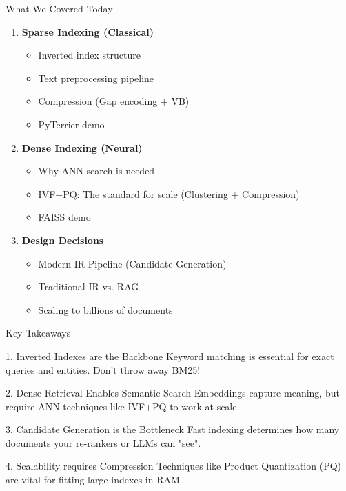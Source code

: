 \documentclass[aspectratio=169]{beamer}
\newif\ifanimated
\newcommand{\cpause}{\ifanimated\pause\fi}
\begin{document}
\begin{frame}[shrink=5]{What We Covered Today}
\begin{enumerate}
    \item \textbf{Sparse Indexing (Classical)}
    \begin{itemize}
        \item Inverted index structure
        \item Text preprocessing pipeline
        \item Compression (Gap encoding + VB)
        \item PyTerrier demo
    \end{itemize}
    
    \item \textbf{Dense Indexing (Neural)}
    \begin{itemize}
        \item Why ANN search is needed
        \item IVF+PQ: The standard for scale (Clustering + Compression)
        \item FAISS demo
    \end{itemize}
    
    \item \textbf{Design Decisions}
    \begin{itemize}
        \item Modern IR Pipeline (Candidate Generation)
        \item Traditional IR vs. RAG
        \item Scaling to billions of documents
    \end{itemize}
\end{enumerate}
\end{frame}

\begin{frame}[shrink=5]{Key Takeaways}
\begin{block}{1. Inverted Indexes are the Backbone}
Keyword matching is essential for exact queries and entities. Don't throw away BM25!
\end{block}
\cpause

\begin{block}{2. Dense Retrieval Enables Semantic Search}
Embeddings capture meaning, but require ANN techniques like IVF+PQ to work at scale.
\end{block}
\cpause

\begin{block}{3. Candidate Generation is the Bottleneck}
Fast indexing determines how many documents your re-rankers or LLMs can "see".
\end{block}
\cpause

\begin{block}{4. Scalability requires Compression}
Techniques like Product Quantization (PQ) are vital for fitting large indexes in RAM.
\end{block}
\cpause
\end{frame}
\end{document}
